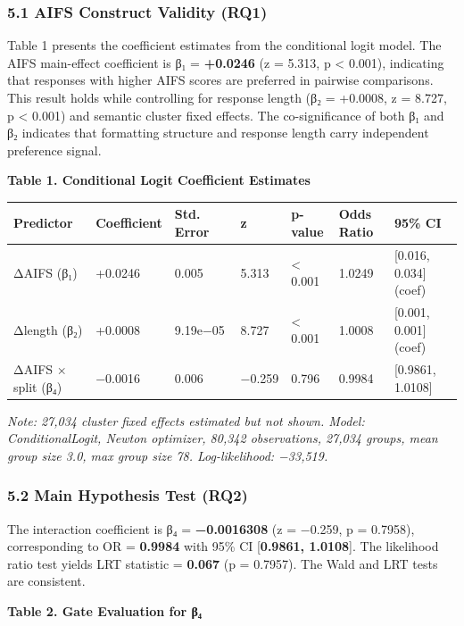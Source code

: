 
\subsubsection{5.1 AIFS Construct Validity (RQ1)}

Table 1 presents the coefficient estimates from the conditional logit model. The AIFS main-effect coefficient is β₁ = \textbf{+0.0246} (z = 5.313, p < 0.001), indicating that responses with higher AIFS scores are preferred in pairwise comparisons. This result holds while controlling for response length (β₂ = +0.0008, z = 8.727, p < 0.001) and semantic cluster fixed effects. The co-significance of both β₁ and β₂ indicates that formatting structure and response length carry independent preference signal.

\textbf{Table 1. Conditional Logit Coefficient Estimates}

\begin{table}[htbp]
\centering
\begin{tabular}{lllllll}
\toprule
Predictor & Coefficient & Std. Error & z & p-value & Odds Ratio & 95\% CI \\
\midrule
ΔAIFS (β₁) & +0.0246 & 0.005 & 5.313 & < 0.001 & 1.0249 & [0.016, 0.034] (coef) \\
Δlength (β₂) & +0.0008 & 9.19e−05 & 8.727 & < 0.001 & 1.0008 & [0.001, 0.001] (coef) \\
ΔAIFS × split (β₄) & −0.0016 & 0.006 & −0.259 & 0.796 & 0.9984 & [0.9861, 1.0108] \\
\bottomrule
\end{tabular}
\end{table}

\textit{Note: 27,034 cluster fixed effects estimated but not shown. Model: ConditionalLogit, Newton optimizer, 80,342 observations, 27,034 groups, mean group size 3.0, max group size 78. Log-likelihood: −33,519.}

\subsubsection{5.2 Main Hypothesis Test (RQ2)}

The interaction coefficient is β₄ = \textbf{−0.0016308} (z = −0.259, p = 0.7958), corresponding to OR = \textbf{0.9984} with 95\% CI [\textbf{0.9861, 1.0108}]. The likelihood ratio test yields LRT statistic = \textbf{0.067} (p = 0.7957). The Wald and LRT tests are consistent.

\textbf{Table 2. Gate Evaluation for β₄}


